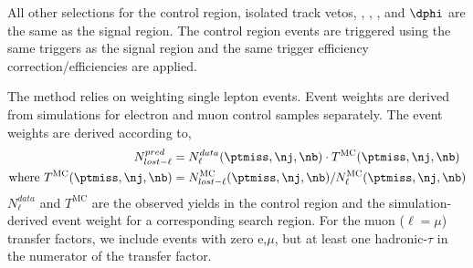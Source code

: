 All other selections for the control region, isolated track vetos, \ST, \ptmiss, \nj,
and $\dphi$ are the same as the signal region. 
The control region events are triggered using the same triggers as the signal region
and the same trigger efficiency correction/efficiencies are applied.  

The method relies on weighting single lepton events. Event weights are derived
from simulations for electron and muon control samples separately.  The event 
weights are derived according to,
\begin{equation} \label{eq1}
\begin{split}
N_{lost-\ell}^{pred} & = N_{\ell}^{data}(\ptmiss,\nj,\nb) \cdot T^{\text{MC}}(\ptmiss,\nj,\nb)\\
\mathrm{where\ } T^{\text{MC}}(\ptmiss,\nj,\nb) & = N^{\text{MC}}_{lost-\ell}(\ptmiss,\nj,\nb) / N^{\text{MC}}_{\ell}(\ptmiss,\nj,\nb)
\end{split}
\end{equation}
$N_{\ell}^{data}$ and $T^{\text{MC}}$ are the observed yields in the control region
and the simulation-derived event weight for a corresponding search region.
For the muon ($\ell=\mu$) transfer factors, we include events with zero e,$\mu$, but at least one
hadronic-$\tau$ in the numerator of the transfer factor.

